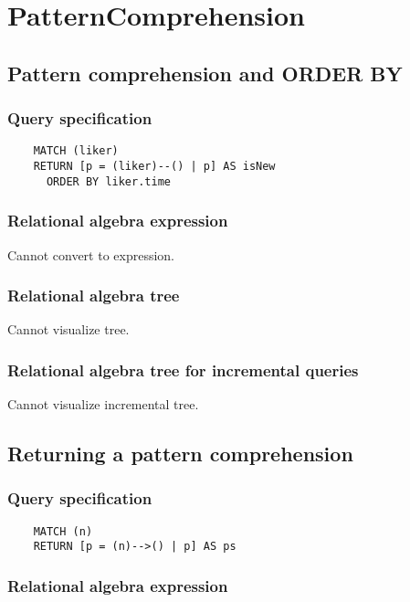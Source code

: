 	\section{PatternComprehension}

	\subsection{Pattern comprehension and ORDER BY}

	\subsubsection*{Query specification}

	\begin{lstlisting}
	MATCH (liker)
	RETURN [p = (liker)--() | p] AS isNew
	  ORDER BY liker.time
	\end{lstlisting}


	\subsubsection*{Relational algebra expression}

	Cannot convert to expression.

	\subsubsection*{Relational algebra tree}

	Cannot visualize tree.

	\subsubsection*{Relational algebra tree for incremental queries}

	Cannot visualize incremental tree.
	\subsection{Returning a pattern comprehension}

	\subsubsection*{Query specification}

	\begin{lstlisting}
	MATCH (n)
	RETURN [p = (n)-->() | p] AS ps
	\end{lstlisting}


	\subsubsection*{Relational algebra expression}

